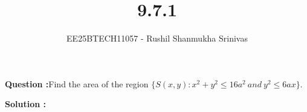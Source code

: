 \documentclass[journal]{IEEEtran}
\begin{document}




\title{9.7.1}
\author{EE25BTECH11057 - Rushil Shanmukha Srinivas
}
{\let\newpage\relax\maketitle}

\renewcommand{\thefigure}{\theenumi}
\renewcommand{\thetable}{\theenumi}
\setlength{\intextsep}{10pt} %

\renewcommand{\thetable}{\theenumi}
\textbf{Question :}Find the area of the region $\{
S(x,y) :
x^2 + y^2 \leq 16a^2 \ and \ y^2 \leq 6ax 
\}$.

\textbf{Solution :}
\begin{table}[h!]
  \centering
  
  \caption*{Table : Conics}
  \label{9.2.20}
\end{table}
\end{document}
